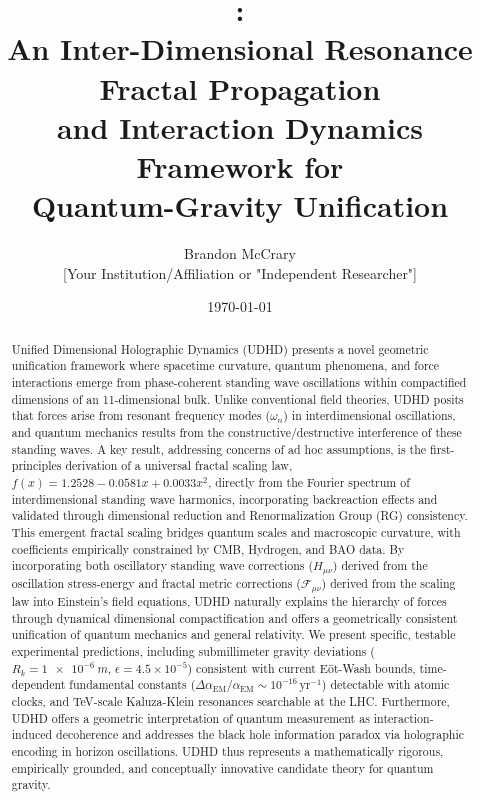 \documentclass[12pt, a4paper]{article} %
\title{\udhd: \\ An Inter-Dimensional Resonance Fractal Propagation \\ and Interaction Dynamics Framework for \\ Quantum-Gravity Unification}
\author{Brandon McCrary \\ \small{[Your Institution/Affiliation or "Independent Researcher"]}}
\date{\today}
\begin{document}
\maketitle

\begin{abstract}
\noindent
Unified Dimensional Holographic Dynamics (UDHD) presents a novel geometric unification framework where spacetime curvature, quantum phenomena, and force interactions emerge from phase-coherent standing wave oscillations within compactified dimensions of an 11-dimensional bulk. Unlike conventional field theories, UDHD posits that forces arise from resonant frequency modes (\(\omega_n\)) in interdimensional oscillations, and quantum mechanics results from the constructive/destructive interference of these standing waves. A key result, addressing concerns of ad hoc assumptions, is the first-principles derivation of a universal fractal scaling law, \(f(x) = 1.2528 - 0.0581x + 0.0033x^2\), directly from the Fourier spectrum of interdimensional standing wave harmonics, incorporating backreaction effects and validated through dimensional reduction and Renormalization Group (RG) consistency. This emergent fractal scaling bridges quantum scales and macroscopic curvature, with coefficients empirically constrained by CMB, Hydrogen, and BAO data. By incorporating both oscillatory standing wave corrections (\(H_{\mu\nu}\)) derived from the oscillation stress-energy and fractal metric corrections (\(\mathcal{F}_{\mu\nu}\)) derived from the scaling law into Einstein's field equations, UDHD naturally explains the hierarchy of forces through dynamical dimensional compactification and offers a geometrically consistent unification of quantum mechanics and general relativity. We present specific, testable experimental predictions, including submillimeter gravity deviations (\(R_k = \SI{1e-6}{m}\), \(\epsilon = 4.5 \times 10^{-5}\)) consistent with current Eöt-Wash bounds, time-dependent fundamental constants (\(\Delta \alpha_{\text{EM}}/\alpha_{\text{EM}} \sim 10^{-16}\,\text{yr}^{-1}\)) detectable with atomic clocks, and TeV-scale Kaluza-Klein resonances searchable at the LHC. Furthermore, UDHD offers a geometric interpretation of quantum measurement as interaction-induced decoherence and addresses the black hole information paradox via holographic encoding in horizon oscillations. UDHD thus represents a mathematically rigorous, empirically grounded, and conceptually innovative candidate theory for quantum gravity.
\end{abstract}
\end{document}
